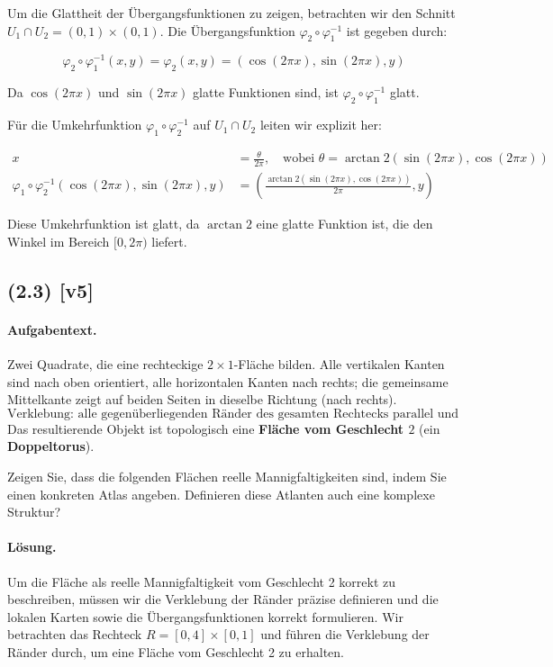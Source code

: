 \documentclass[11pt,a4paper]{article}
\begin{document}
Um die Glattheit der Übergangsfunktionen zu zeigen, betrachten wir den Schnitt \(U_1 \cap U_2 = (0,1) \times (0,1)\). Die Übergangsfunktion \(\varphi_2 \circ \varphi_1^{-1}\) ist gegeben durch:

\[
\varphi_2 \circ \varphi_1^{-1}(x,y) = \varphi_2(x,y) = (\cos(2\pi x), \sin(2\pi x), y)
\]

Da \(\cos(2\pi x)\) und \(\sin(2\pi x)\) glatte Funktionen sind, ist \(\varphi_2 \circ \varphi_1^{-1}\) glatt.

Für die Umkehrfunktion \(\varphi_1 \circ \varphi_2^{-1}\) auf \(U_1 \cap U_2\) leiten wir explizit her:

\[
\begin{align*}
x &= \frac{\theta}{2\pi}, \quad \text{wobei } \theta = \arctan2(\sin(2\pi x), \cos(2\pi x)) \\
\varphi_1 \circ \varphi_2^{-1}(\cos(2\pi x), \sin(2\pi x), y) &= \left(\frac{\arctan2(\sin(2\pi x), \cos(2\pi x))}{2\pi}, y\right)
\end{align*}
\]

Diese Umkehrfunktion ist glatt, da \(\arctan2\) eine glatte Funktion ist, die den Winkel im Bereich \([0, 2\pi)\) liefert.


\subsection*{(2.3) [v5]}
\paragraph{Aufgabentext.}
Zwei Quadrate, die eine rechteckige $2\times1$-Fläche bilden.  
Alle vertikalen Kanten sind nach oben orientiert, 
alle horizontalen Kanten nach rechts; 
die gemeinsame Mittelkante zeigt auf beiden Seiten in dieselbe Richtung (nach rechts).  
\[
\text{Verklebung: alle gegenüberliegenden Ränder des gesamten Rechtecks parallel und gleich orientiert.}
\]
Das resultierende Objekt ist topologisch eine \textbf{Fläche vom Geschlecht $2$} (ein \textbf{Doppeltorus}).

Zeigen Sie, dass die folgenden Flächen reelle Mannigfaltigkeiten sind, indem Sie einen konkreten Atlas angeben. Definieren diese Atlanten auch eine komplexe Struktur?

\paragraph{Lösung.}
Um die Fläche als reelle Mannigfaltigkeit vom Geschlecht 2 korrekt zu beschreiben, müssen wir die Verklebung der Ränder präzise definieren und die lokalen Karten sowie die Übergangsfunktionen korrekt formulieren. Wir betrachten das Rechteck $R = [0, 4] \times [0, 1]$ und führen die Verklebung der Ränder durch, um eine Fläche vom Geschlecht 2 zu erhalten.
\end{document}
